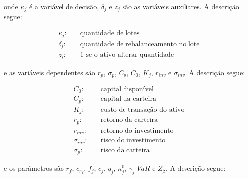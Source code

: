         \noindent onde $\kappa_{j}$ é a variável de decisão, $\delta_{j}$ e $z_{j}$ são as variáveis auxiliares. A descrição segue:

        \begin{equation*}
            \begin{aligned}
                \kappa_{j} : \quad & \text{quantidade de lotes} \\
                \delta_{j} : \quad & \text{quantidade de rebalanceamento no lote} \\
                z_{j} : \quad & \text{1 se o ativo alterar quantidade}
            \end{aligned}
        \end{equation*}

        \noindent e as variáveis dependentes são $r_{p}$, $\sigma_{p}$, $C_{p}$, $C_{0}$, $K_{j}$, $r_{inv}$ e $\sigma_{inv}$. A descrição segue:

        \begin{equation*}
            \begin{aligned}
                C_{0} : \quad & \text{capital disponível} \\
                C_{p} : \quad & \text{capital da carteira} \\
                K_{j} : \quad & \text{custo de transação do ativo} \\
                r_{p} : \quad & \text{retorno da carteira} \\
                r_{inv} : \quad & \text{retorno do investimento} \\
                \sigma_{inv} : \quad & \text{risco do investimento} \\
                \sigma_{p} : \quad & \text{risco da carteira}
            \end{aligned}
        \end{equation*}

        \noindent e os parâmetros são $r_{f}$, $c_{r_{f}}$, $f_{j}$, $c_{j}$, $q_{j}$, $\kappa_{j}^{0}$, $\gamma_{j}$ $VaR$ e $Z_{\beta}$. A descrição segue:

